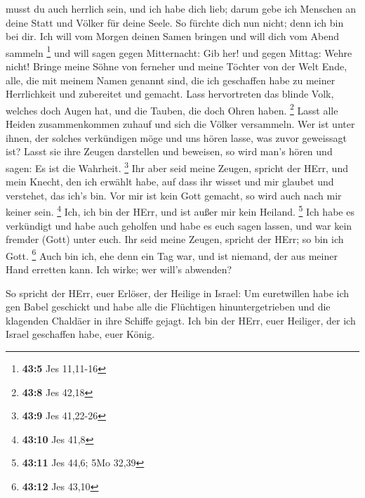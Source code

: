 musst du auch herrlich sein, und ich habe dich lieb; darum gebe ich
Menschen an deine Statt und Völker für deine Seele.  So
fürchte dich nun nicht; denn ich bin bei dir. Ich will vom Morgen deinen
Samen bringen und will dich vom Abend sammeln \footnote{\textbf{43:5}
  Jes 11,11-16}  und will sagen gegen Mitternacht: Gib her!
und gegen Mittag: Wehre nicht! Bringe meine Söhne von ferneher und meine
Töchter von der Welt Ende,  alle, die mit meinem Namen
genannt sind, die ich geschaffen habe zu meiner Herrlichkeit und
zubereitet und gemacht.  Lass hervortreten das blinde Volk,
welches doch Augen hat, und die Tauben, die doch Ohren haben.
\footnote{\textbf{43:8} Jes 42,18}  Lasst alle Heiden
zusammenkommen zuhauf und sich die Völker versammeln. Wer ist unter
ihnen, der solches verkündigen möge und uns hören lasse, was zuvor
geweissagt ist? Lasst sie ihre Zeugen darstellen und beweisen, so wird
man's hören und sagen: Es ist die Wahrheit. \footnote{\textbf{43:9} Jes
  41,22-26}  Ihr aber seid meine Zeugen, spricht der HErr,
und mein Knecht, den ich erwählt habe, auf dass ihr wisset und mir
glaubet und verstehet, das ich's bin. Vor mir ist kein Gott gemacht, so
wird auch nach mir keiner sein. \footnote{\textbf{43:10} Jes 41,8}
 Ich, ich bin der HErr, und ist außer mir kein Heiland.
\footnote{\textbf{43:11} Jes 44,6; 5Mo 32,39}  Ich habe es
verkündigt und habe auch geholfen und habe es euch sagen lassen, und war
kein fremder (Gott) unter euch. Ihr seid meine Zeugen, spricht der HErr;
so bin ich Gott. \footnote{\textbf{43:12} Jes 43,10}  Auch
bin ich, ehe denn ein Tag war, und ist niemand, der aus meiner Hand
erretten kann. Ich wirke; wer will's abwenden?

 So spricht der HErr, euer Erlöser, der Heilige in Israel:
Um euretwillen habe ich gen Babel geschickt und habe alle die Flüchtigen
hinuntergetrieben und die klagenden Chaldäer in ihre Schiffe gejagt.
 Ich bin der HErr, euer Heiliger, der ich Israel geschaffen
habe, euer König.

